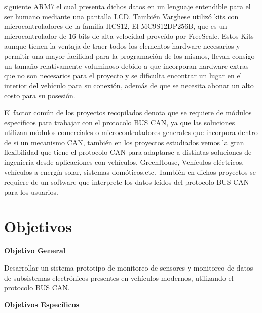 siguiente ARM7 el cual presenta dichos datos en un lenguaje entendible para el ser humano mediante una pantalla LCD. También Varghese \cite{ICAN} utilizó kits con microcontroladores de la familia HCS12, El MC9S12DP256B, que es un microcontrolador de 16 bits de alta velocidad proveído por FreeScale. Estos Kits aunque tienen la ventaja de traer todos los elementos hardware necesarios y permitir una mayor facilidad para la programación de los mismos, llevan consigo un tamaño relativamente voluminoso debido a que incorporan hardware extras que no son necesarios para el proyecto y se dificulta encontrar un lugar en el interior del vehículo para su conexión, además de que se necesita abonar un alto costo para su posesión.

El factor  común de los proyectos recopilados denota que se requiere de módulos específicos para trabajar con el protocolo BUS CAN, ya que las soluciones  utilizan módulos comerciales  o microcontroladores generales que incorpora dentro de si un mecanismo CAN, también en los proyectos estudiados vemos la gran flexibilidad que tiene el protocolo CAN para adaptarse a distintas soluciones de ingeniería desde aplicaciones con vehículos, GreenHouse, Vehículos eléctricos, vehículos a energía solar, sistemas domóticos,etc. También en dichos proyectos se requiere de un software que interprete los datos leídos del protocolo BUS CAN para los usuarios.  



 
 


\newpage

\section{Objetivos}


\begin{center}
\textbf{Objetivo General}
\end{center}
Desarrollar un sistema prototipo de monitoreo de sensores y monitoreo de datos de subsistemas electrónicos presentes en vehículos modernos, utilizando el protocolo BUS CAN.
\begin{center}
\textbf{Objetivos Específicos}
\end{center}

